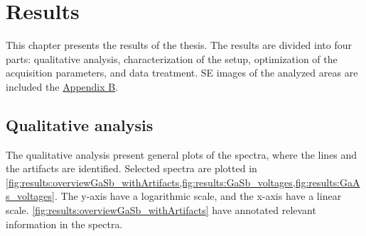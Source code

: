 \chapter{Results}
\label{ch:results}




This chapter presents the results of the thesis.
The results are divided into four parts: qualitative analysis, characterization of the setup, optimization of the acquisition parameters, and data treatment.
SE images of the analyzed areas are included the \hyperref[appendix:SE_images]{Appendix B}.



\section{Qualitative analysis}
\label{results:qualitative_analysis}

The qualitative analysis present general plots of the spectra, where the lines and the artifacts are identified.
Selected spectra are plotted in \cref{fig:results:overviewGaSb_withArtifacts,fig:results:GaSb_voltages,fig:results:GaAs_voltages}.
The y-axis have a logarithmic scale, and the x-axis have a linear scale.
\cref{fig:results:overviewGaSb_withArtifacts} have annotated relevant information in the spectra.


